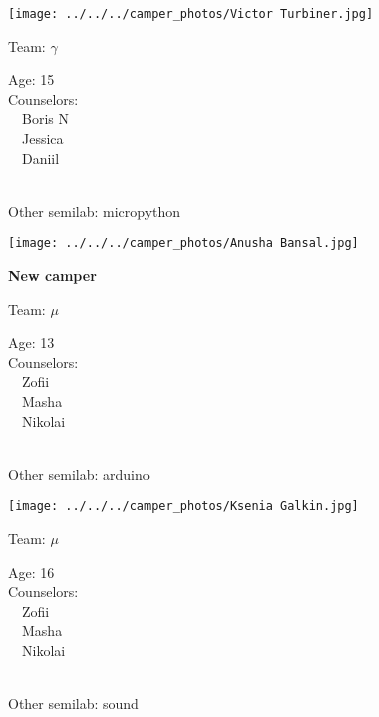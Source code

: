 \documentclass[10pt,letterpaper, landscape]{article}
\begin{document}
\horizontalshiftfornextsticker
\renewcommand{\baselinestretch}{1} \begin{sticker}
\noindent\begin{minipage}{0.5\textwidth}\texttt{[image: ../../../camper\_photos/Victor Turbiner.jpg]}\end{minipage}\begin{minipage}{0.45\textwidth}
Team: {\Large $\gamma$}

Age:        15\\
Counselors: \\\ \ Boris N\\\ \ Jessica\\\ \ Daniil\\
\end{minipage} \\ \vspace{0.07in}
Other semilab: micropython
\end{sticker}
\horizontalshiftfornextsticker
\renewcommand{\baselinestretch}{1} \begin{sticker}
\noindent\begin{minipage}{0.5\textwidth}\texttt{[image: ../../../camper\_photos/Anusha Bansal.jpg]}\end{minipage}\begin{minipage}{0.45\textwidth}
\textbf{New camper} 

Team: {\Large $\mu$}

Age:        13\\
Counselors: \\\ \ Zofii\\\ \ Masha\\\ \ Nikolai\\
\end{minipage} \\ \vspace{0.07in}
Other semilab: arduino
\end{sticker}
\verticalshiftfornextsticker
\renewcommand{\baselinestretch}{1} \begin{sticker}
\noindent\begin{minipage}{0.5\textwidth}\texttt{[image: ../../../camper\_photos/Ksenia Galkin.jpg]}\end{minipage}\begin{minipage}{0.45\textwidth}
Team: {\Large $\mu$}

Age:        16\\
Counselors: \\\ \ Zofii\\\ \ Masha\\\ \ Nikolai\\
\end{minipage} \\ \vspace{0.07in}
Other semilab: sound
\end{sticker}
\end{document}
